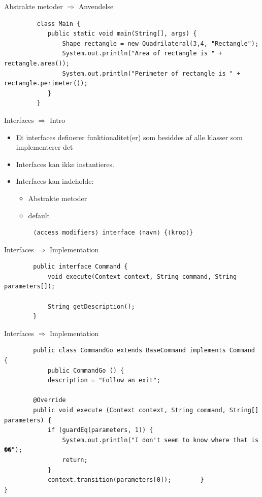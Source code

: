 \documentclass[10pt,aspectratio=1610]{beamer}
\begin{document}
\begin{frame}[fragile]{Abstrakte metoder $\Rightarrow$ Anvendelse}
     \begin{lstlisting}
         class Main {
            public static void main(String[], args) {
                Shape rectangle = new Quadrilateral(3,4, "Rectangle");
                System.out.println("Area of rectangle is " + rectangle.area());
                System.out.println("Perimeter of rectangle is " + rectangle.perimeter());
            }
         }
     \end{lstlisting}
\end{frame}
\begin{frame}[fragile]{Interfaces $\Rightarrow$ Intro}
    \begin{itemize}
        \item Et interfaces definerer funktionalitet(er) som besiddes af alle klasser som implementerer det
        \item Interfaces kan ikke instantieres.

        \item Interfaces kan indeholde:
        \begin{itemize}
            \item Abstrakte metoder
            \item default
        \end{itemize}
    \end{itemize}
    \begin{verbatim}
        ⟨access modifiers⟩ interface ⟨navn⟩ {⟨krop⟩}
    \end{verbatim}
\end{frame}

\begin{frame}[fragile]{Interfaces $\Rightarrow$ Implementation}
        \begin{lstlisting}
        public interface Command {
            void execute(Context context, String command, String parameters[]);
            
            String getDescription();
        }
    \end{lstlisting}
    
\end{frame}

\begin{frame}[fragile]{Interfaces $\Rightarrow$ Implementation}
        \begin{lstlisting}
        public class CommandGo extends BaseCommand implements Command {
            public CommandGo () {
            description = "Follow an exit";
        
        @Override
        public void execute (Context context, String command, String[] parameters) {
            if (guardEq(parameters, 1)) {
                System.out.println("I don't seem to know where that is ��");
                return;
            }
            context.transition(parameters[0]);        }
}
    \end{lstlisting}
    
\end{frame}
\end{document}
